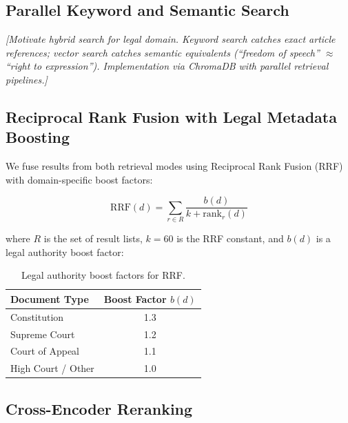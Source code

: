 \documentclass[11pt]{article}
\begin{document}
\subsection{Parallel Keyword and Semantic Search}


\textit{[Motivate hybrid search for legal domain. Keyword search catches
exact article references; vector search catches semantic equivalents
(``freedom of speech'' $\approx$ ``right to expression'').
Implementation via ChromaDB with parallel retrieval pipelines.]}


\subsection{Reciprocal Rank Fusion with Legal Metadata Boosting}


We fuse results from both retrieval modes using Reciprocal Rank Fusion
(RRF) \cite{cormack2009reciprocal} with domain-specific boost factors:

\begin{equation}
\text{RRF}(d) = \sum_{r \in R} \frac{b(d)}{k + \text{rank}_r(d)}
\end{equation}

where $R$ is the set of result lists, $k = 60$ is the RRF constant, and
$b(d)$ is a legal authority boost factor:

\begin{table}[h]
\centering
\small
\begin{tabular}{lc}
\toprule
\textbf{Document Type} & \textbf{Boost Factor} $b(d)$ \\
\midrule
Constitution & 1.3 \\
Supreme Court & 1.2 \\
Court of Appeal & 1.1 \\
High Court / Other & 1.0 \\
\bottomrule
\end{tabular}
\caption{Legal authority boost factors for RRF.}
\label{tab:boost-factors}
\end{table}

\subsection{Cross-Encoder Reranking}
\end{document}
